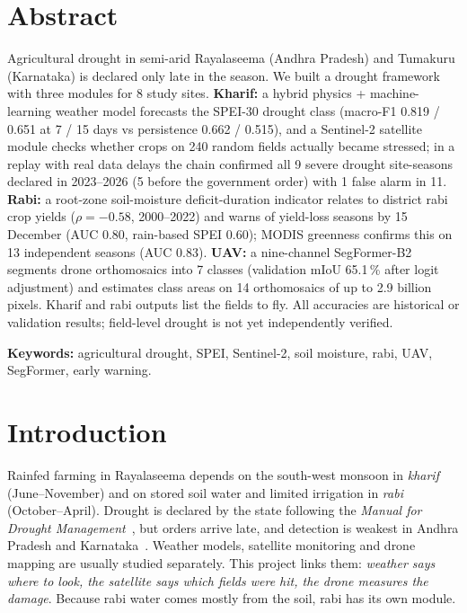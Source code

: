 \documentclass[11pt,a4paper,oneside]{article}
\newcommand{\mf}{macro-F1}
\begin{document}
\section*{Abstract}
Agricultural drought in semi-arid Rayalaseema (Andhra Pradesh) and Tumakuru (Karnataka) is declared only late in the season. We built a drought framework with three modules for 8 study sites. \textbf{Kharif:} a hybrid physics + machine-learning weather model forecasts the SPEI-30 drought class (\mf{} 0.819 / 0.651 at 7 / 15 days vs persistence 0.662 / 0.515), and a Sentinel-2 satellite module checks whether crops on 240 random fields actually became stressed; in a replay with real data delays the chain confirmed all 9 severe drought site-seasons declared in 2023--2026 (5 before the government order) with 1 false alarm in 11. \textbf{Rabi:} a root-zone soil-moisture deficit-duration indicator relates to district rabi crop yields ($\rho = -0.58$, 2000--2022) and warns of yield-loss seasons by 15 December (AUC 0.80, rain-based SPEI 0.60); MODIS greenness confirms this on 13 independent seasons (AUC 0.83). \textbf{UAV:} a nine-channel SegFormer-B2 segments drone orthomosaics into 7 classes (validation mIoU 65.1\,\% after logit adjustment) and estimates class areas on 14 orthomosaics of up to 2.9 billion pixels. Kharif and rabi outputs list the fields to fly. All accuracies are historical or validation results; field-level drought is not yet independently verified.

\textbf{Keywords:} agricultural drought, SPEI, Sentinel-2, soil moisture, rabi, UAV, SegFormer, early warning.


\section{Introduction}
Rainfed farming in Rayalaseema depends on the south-west monsoon in \emph{kharif} (June--November) and on stored soil water and limited irrigation in \emph{rabi} (October--April). Drought is declared by the state following the \textit{Manual for Drought Management}~\cite{manual2016}, but orders arrive late, and detection is weakest in Andhra Pradesh and Karnataka~\cite{bhardwaj2021}. Weather models, satellite monitoring and drone mapping are usually studied separately. This project links them: \emph{weather says where to look, the satellite says which fields were hit, the drone measures the damage}. Because rabi water comes mostly from the soil, rabi has its own module.
\end{document}
